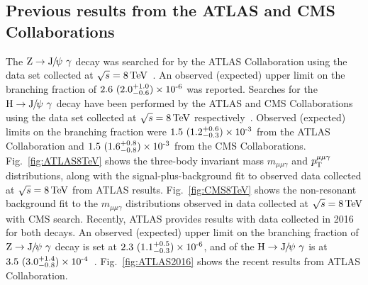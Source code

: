 \subsection{Previous results from the ATLAS and CMS Collaborations}
The $\mathrm{Z} \to{\mathrm{J}\hspace{-.08em}/\hspace{-.14em}\psi}\ \gamma$ decay was searched for by the ATLAS Collaboration using the data set collected at $\sqrt{s}=8\,\text{Te\hspace{-.08em}V}$~\cite{Aad:2015sda}. An observed (expected) upper limit on the branching fraction of $2.6\ (2.0^{+1.0}_{-0.6})\times \text{10}^\text{-6}$ was reported. 
Searches for the $\PH\to\JPsi\ \gamma$ decay have been performed by the ATLAS and CMS Collaborations using the data set collected at $\sqrt{s}=8\,\text{Te\hspace{-.08em}V}$ respectively~\cite{Aad:2015sda,Run1Paper_Dalitz}. Observed (expected) limits on the branching fraction were $1.5\ (1.2^{+0.6}_{-0.3})\times \text{10}^\text{-3}$ from the ATLAS Collaboration and $1.5\ (1.6^{+0.8}_{-0.8})\ten{-3}$ from the CMS Collaborations. Fig.~\ref{fig:ATLAS8TeV} shows the three-body invariant mass $m_{\mu\mu\gamma}$ and $p_{\mathrm{T}}^{\mu\mu\gamma}$ distributions, along with the signal-plus-background fit to observed data collected at $\sqrt{s}=8\,\text{Te\hspace{-.08em}V}$ from ATLAS results. Fig.~\ref{fig:CMS8TeV} shows the non-resonant background fit to the $m_{\mu\mu\gamma}$ distributions observed in data collected at $\sqrt{s}=8\,\text{Te\hspace{-.08em}V}$ with CMS search.
Recently, ATLAS provides results with data collected in 2016 for both decays. An observed (expected) upper limit on the branching fraction of $\mathrm{Z} \to{\mathrm{J}\hspace{-.08em}/\hspace{-.14em}\psi}\ \gamma$ decay is set at $2.3\ (1.1^{+0.5}_{-0.3})\times \text{10}^\text{-6}$, and of the $\PH\to\JPsi\ \gamma$ is at $3.5\ (3.0^{+1.4}_{-0.8})\times \text{10}^\text{-4}$~\cite{Aaboud:2018txb}.
Fig.~\ref{fig:ATLAS2016} shows the recent results from ATLAS Collaboration.

